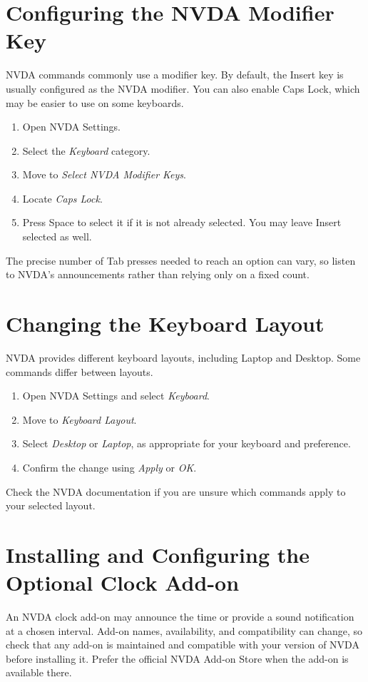 \documentclass[11pt,oneside]{book}
\begin{document}
\chapter{Configuring the NVDA Modifier Key}
NVDA commands commonly use a modifier key. By default, the Insert key is usually configured as the NVDA modifier. You can also enable Caps Lock, which may be easier to use on some keyboards.
\begin{enumerate}
	\item Open NVDA Settings.
	\item Select the \textit{Keyboard} category.
	\item Move to \textit{Select NVDA Modifier Keys}.
	\item Locate \textit{Caps Lock}.
	\item Press Space to select it if it is not already selected. You may leave Insert selected as well.
\end{enumerate}
The precise number of Tab presses needed to reach an option can vary, so listen to NVDA's announcements rather than relying only on a fixed count.

\chapter{Changing the Keyboard Layout}
NVDA provides different keyboard layouts, including Laptop and Desktop. Some commands differ between layouts.
\begin{enumerate}
	\item Open NVDA Settings and select \textit{Keyboard}.
	\item Move to \textit{Keyboard Layout}.
	\item Select \textit{Desktop} or \textit{Laptop}, as appropriate for your keyboard and preference.
	\item Confirm the change using \textit{Apply} or \textit{OK}.
\end{enumerate}
Check the NVDA documentation if you are unsure which commands apply to your selected layout.

\chapter{Installing and Configuring the Optional Clock Add-on}
An NVDA clock add-on may announce the time or provide a sound notification at a chosen interval. Add-on names, availability, and compatibility can change, so check that any add-on is maintained and compatible with your version of NVDA before installing it. Prefer the official NVDA Add-on Store when the add-on is available there.
\end{document}
